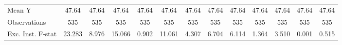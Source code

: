 {\begin{tabular}{l*{12}{c}}
\midrule
Mean Y      &       47.64         &       47.64         &       47.64         &       47.64         &       47.64         &       47.64         &       47.64         &       47.64         &       47.64         &       47.64         &       47.64         &       47.64         \\
Observations&         535         &         535         &         535         &         535         &         535         &         535         &         535         &         535         &         535         &         535         &         535         &         535         \\
Exc. Inst. F-stat&      23.283         &       8.976         &      15.066         &       0.902         &      11.061         &       4.307         &       6.704         &       6.114         &       1.364         &       3.510         &       0.001         &       0.515         \\
\bottomrule
\end{tabular}
}
